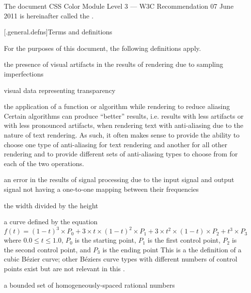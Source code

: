\pnum
The document CSS Color Module Level 3 --- W3C Recommendation 07 June 2011 is 
hereinafter called the .

[\iotwod.general.defns]{Terms and definitions}

\pnum
{}
For the purposes of this document, the following definitions apply.

the presence of visual artifacts in the results of rendering due to 
sampling imperfections

visual data representing transparency

the application of a function or algorithm while rendering to 
reduce aliasing
\enternote
Certain algorithms can produce ``better'' results, i.e. results with less 
artifacts or with less pronounced artifacts, when rendering text with 
anti-aliasing due to the nature of text rendering. As such, it often makes 
sense to provide the ability to choose one type of anti-aliasing for text 
rendering and another for all other rendering and to provide different sets of 
anti-aliasing types to choose from for each of the two operations.
\exitnote

an error in the results of signal processing due to the input signal and output 
signal not having a one-to-one mapping between their frequencies

the width divided by the height

a curve defined by the 
equation $f(t) = (1 - t)^{3} \times P_{0} + 3 \times t \times (1 - t)^{2} 
\times P_{1} + 3 \times t^{2} \times (1 - t) \times P_{2} + t^{3} \times P_{3}$ 
where $0.0 \le t \le 1.0$, $P_{0}$ is the starting point, $P_{1}$ is the first 
control point, $P_{2}$ is the second control point, and $P_{3}$ is the 
ending point
\enternote
This is a the definition of a cubic B\'ezier curve; other B\'eziers curve types 
with different numbers of control points exist but are not relevant in this 
\documenttypename.
\exitnote

a bounded set of homogeneously-spaced rational numbers

